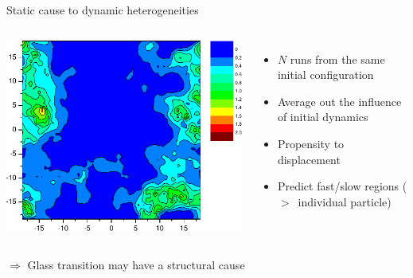 \begin{frame}{Static cause to dynamic heterogeneities}
	\begin{columns}
	\centering
	\includegraphics[width=\columnwidth]{propensity}
	{\footnotesize\citet{Widmer-Cooper2005}}
	\begin{itemize}
		\item $N$ runs from the same initial configuration
		\item Average out the influence of initial dynamics
		\item Propensity to displacement
		\item Predict fast/slow \alert{regions} ($>$~individual particle)\\{\footnotesize\citet{Berthier2007}}
	\end{itemize}
	\end{columns}
	
	\bigskip$\Rightarrow$ Glass transition may have a structural cause
\end{frame}

